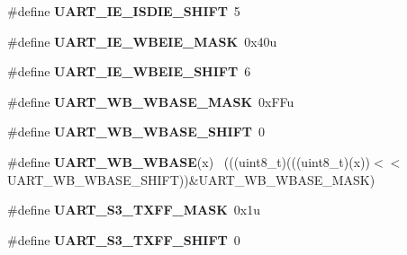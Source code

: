 \begin{DoxyCompactItemize}
\item 
\hypertarget{group___u_a_r_t___register___masks_ga016ed9c75415ddf32a6e6ce7dbb319e3}{}\#define {\bfseries U\+A\+R\+T\+\_\+\+I\+E\+\_\+\+I\+S\+D\+I\+E\+\_\+\+S\+H\+I\+F\+T}~5\label{group___u_a_r_t___register___masks_ga016ed9c75415ddf32a6e6ce7dbb319e3}

\item 
\hypertarget{group___u_a_r_t___register___masks_gad9b5eb0a2f80a387037e79f72d7f82bf}{}\#define {\bfseries U\+A\+R\+T\+\_\+\+I\+E\+\_\+\+W\+B\+E\+I\+E\+\_\+\+M\+A\+S\+K}~0x40u\label{group___u_a_r_t___register___masks_gad9b5eb0a2f80a387037e79f72d7f82bf}

\item 
\hypertarget{group___u_a_r_t___register___masks_ga1570e2d6225e2cd1aff4d2a8047f3d7b}{}\#define {\bfseries U\+A\+R\+T\+\_\+\+I\+E\+\_\+\+W\+B\+E\+I\+E\+\_\+\+S\+H\+I\+F\+T}~6\label{group___u_a_r_t___register___masks_ga1570e2d6225e2cd1aff4d2a8047f3d7b}

\item 
\hypertarget{group___u_a_r_t___register___masks_ga779526edba4ccaf115a84288de1126af}{}\#define {\bfseries U\+A\+R\+T\+\_\+\+W\+B\+\_\+\+W\+B\+A\+S\+E\+\_\+\+M\+A\+S\+K}~0x\+F\+Fu\label{group___u_a_r_t___register___masks_ga779526edba4ccaf115a84288de1126af}

\item 
\hypertarget{group___u_a_r_t___register___masks_gaa919c6a56d13959df2307ec498de0903}{}\#define {\bfseries U\+A\+R\+T\+\_\+\+W\+B\+\_\+\+W\+B\+A\+S\+E\+\_\+\+S\+H\+I\+F\+T}~0\label{group___u_a_r_t___register___masks_gaa919c6a56d13959df2307ec498de0903}

\item 
\hypertarget{group___u_a_r_t___register___masks_gafe8022f919134ecab9aacf97994d9d5a}{}\#define {\bfseries U\+A\+R\+T\+\_\+\+W\+B\+\_\+\+W\+B\+A\+S\+E}(x)                                              ~(((uint8\+\_\+t)(((uint8\+\_\+t)(x))$<$$<$U\+A\+R\+T\+\_\+\+W\+B\+\_\+\+W\+B\+A\+S\+E\+\_\+\+S\+H\+I\+F\+T))\&U\+A\+R\+T\+\_\+\+W\+B\+\_\+\+W\+B\+A\+S\+E\+\_\+\+M\+A\+S\+K)\label{group___u_a_r_t___register___masks_gafe8022f919134ecab9aacf97994d9d5a}

\item 
\hypertarget{group___u_a_r_t___register___masks_ga1f4d11a488c793f25ef9bbaa942eeef7}{}\#define {\bfseries U\+A\+R\+T\+\_\+\+S3\+\_\+\+T\+X\+F\+F\+\_\+\+M\+A\+S\+K}~0x1u\label{group___u_a_r_t___register___masks_ga1f4d11a488c793f25ef9bbaa942eeef7}

\item 
\hypertarget{group___u_a_r_t___register___masks_gacf1857463af29e0124cea398da83efd7}{}\#define {\bfseries U\+A\+R\+T\+\_\+\+S3\+\_\+\+T\+X\+F\+F\+\_\+\+S\+H\+I\+F\+T}~0\label{group___u_a_r_t___register___masks_gacf1857463af29e0124cea398da83efd7}


\end{DoxyCompactItemize}

